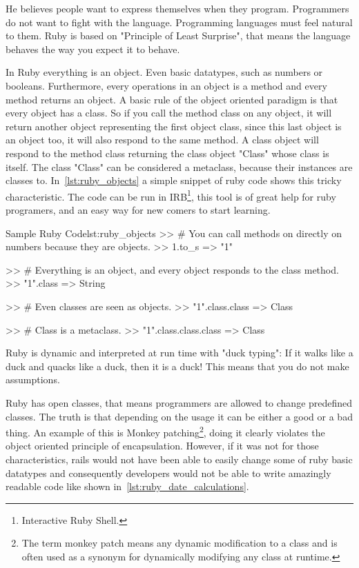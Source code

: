 He believes people want to express themselves when they program. 
Programmers do not want to fight with the language.
Programming languages must feel natural to them.
Ruby is based on "Principle of Least Surprise", 
that means the language behaves the way you expect it to behave.

In Ruby everything is an object. Even basic datatypes, such as numbers or booleans.
Furthermore, every operations in an object is a method and every method returns an object.
A basic rule of the object oriented paradigm is that every object has a class.
So if you call the method class on any object,
it will return another object representing the first object class, 
since this last object is an object too, 
it will also respond to the same method. 
A class object will respond to the method class returning the class object "Class" whose class is itself. 
The class "Class" can be considered a metaclass, because their instances are classes to.
In~\ref{lst:ruby_objects} a simple snippet of ruby code shows this tricky characteristic.
The code can be run in 
\textsf{IRB}\footnote{Interactive Ruby Shell.}, this tool is of great help for ruby programers,
and an easy way for new comers to start learning.

\begin{rubycode}{Sample Ruby Code}{lst:ruby_objects}
  >> # You can call methods on directly on numbers because they are objects.
  >> 1.to_s
  => "1"

  >> # Everything is an object, and every object responds to the class method.
  >> "1".class
  => String

  >> # Even classes are seen as objects.
  >> "1".class.class
  => Class

  >> # Class is a metaclass. 
  >> "1".class.class.class
  => Class
\end{rubycode}

Ruby is dynamic and interpreted at run time with "duck typing": 
If it walks like a duck and quacks like a duck, then it is a duck! This means that you do not make assumptions.

Ruby has open classes, that means programmers are allowed to change predefined classes.
The truth is that depending on the usage it can be either a good or a bad thing. 
An example of this is 
\textsf{Monkey patching}\footnote{
  The term monkey patch means any dynamic modification to a class and 
  is often used as a synonym for dynamically modifying any class at runtime.
},
doing it clearly violates the object oriented principle of encapsulation.
However, if it was not for those characteristics, 
rails would not have been able to easily change some of ruby basic datatypes and 
consequently developers would not be able to write amazingly readable code like shown in~\ref{lst:ruby_date_calculations}.

